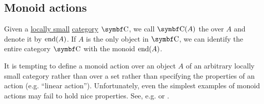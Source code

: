 \subsection{Monoid actions}\label{subsec:monoid_actions}

\begin{definition}\label{def:endomorphism_monoid}
  Given a \hyperref[def:category_cardinality]{locally small} \hyperref[def:category]{category} \( \Cat{C} \), we call \( \Cat{C}(A) \) the  over \( A \) and denote it by \( \operatorname{end}(A) \). If \( A \) is the only object in \( \Cat{C} \), we can identify the entire category \( \Cat{C} \) with the monoid \( \operatorname{end}(A) \).
\end{definition}

\begin{remark}\label{rem:monoid_action_endomorphisms}
  It is tempting to define a monoid action over an object \( A \) of an arbitrary locally small category rather than over a set rather than specifying the properties of an action (e.g. \enquote{linear action}). Unfortunately, even the simplest examples of monoid actions may fail to hold nice properties. See, e.g.  or .
\end{remark}

